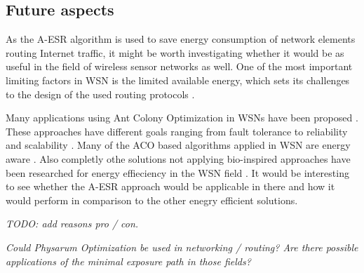 \documentclass[cameraready]{IWORK2014}
\begin{document}
\subsection{Future aspects}
As the A-ESR algorithm is used to save energy consumption of network elements routing Internet traffic, it might be worth investigating whether it would be as useful in the field of wireless sensor networks as well. One of the most important limiting factors in WSN is the limited available energy, which sets its challenges to the design of the used routing protocols \cite{hylsberg2011bioinspired}.

Many applications using Ant Colony Optimization in WSNs have been proposed \cite{bennis2013enhanced, zhang2004improvements, camilo2006energy, cai2006aco, sun2008asar, kiri2007self, ghasemaghaei2007ant}. These approaches have different goals ranging from fault tolerance \cite{zhang2004improvements} to reliability and scalability \cite{kiri2007self}. Many of the ACO based algorithms applied in WSN are energy aware \cite{saleem2011swarm}. Also completly othe solutions not applying bio-inspired approaches have been researched for energy effieciency in the WSN field \cite{wightman2008a3}. It would be interesting to see whether the A-ESR approach would be applicable in there and how it would perform in comparison to the other enegry efficient solutions.

\textit{TODO: add reasons pro / con.}

\textit{Could Physarum Optimization be used in networking / routing? Are there possible applications of the minimal exposure path in those fields?}



\end{document}
